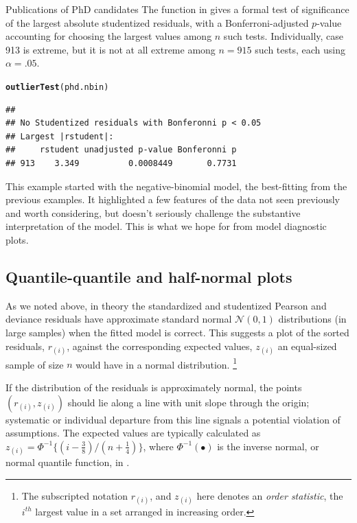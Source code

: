 \documentclass[11pt]{book}\usepackage[]{graphicx}\usepackage[]{color}
\makeatletter
\newcommand{\hlstd}[1]{\textcolor[rgb]{0.345,0.345,0.345}{#1}}%
\newcommand{\hlkwd}[1]{\textcolor[rgb]{0.737,0.353,0.396}{\textbf{#1}}}%
\newenvironment{kframe}{%
 \def\at@end@of@kframe{}%
 \ifinner\ifhmode%
  \def\at@end@of@kframe{\end{minipage}}%
  \begin{minipage}{\columnwidth}%
 \fi\fi%
 \def\FrameCommand##1{\hskip\@totalleftmargin \hskip-\fboxsep
 \colorbox{shadecolor}{##1}\hskip-\fboxsep
     \hskip-\linewidth \hskip-\@totalleftmargin \hskip\columnwidth}%
 \MakeFramed {\advance\hsize-\width
   \@totalleftmargin\z@ \linewidth\hsize
   \@setminipage}}%
 {\par\unskip\endMakeFramed%
 \at@end@of@kframe}
\newenvironment{knitrout}{}{} %
\renewenvironment{knitrout}{\small\renewcommand{\baselinestretch}{.85}}{} %
\makeatother
\begin{document}
\begin{Example}[phdpubs5]{Publications of PhD candidates}
The  function in  gives a formal test of significance of the largest absolute
studentized residuals, with a Bonferroni-adjusted $p$-value accounting for choosing the largest values
among $n$ such tests. Individually, case 913 is extreme, but it is not at all extreme among
$n=915$ such tests, each using $\alpha=.05$.

\begin{knitrout}
\color{fgcolor}\begin{kframe}
\begin{alltt}
\hlkwd{outlierTest}\hlstd{(phd.nbin)}
\end{alltt}
\begin{verbatim}
## 
## No Studentized residuals with Bonferonni p < 0.05
## Largest |rstudent|:
##     rstudent unadjusted p-value Bonferonni p
## 913    3.349          0.0008449       0.7731
\end{verbatim}
\end{kframe}
\end{knitrout}
This example started with the negative-binomial model, the best-fitting from the previous examples.  It highlighted a
few features of the data not seen previously and worth considering, but doesn't seriously challenge the 
substantive interpretation of the model.  This is what we hope for from model diagnostic plots.

\end{Example}

\subsection{Quantile-quantile and half-normal plots}

As we noted above, in theory
the standardized and studentized Pearson and deviance residuals have approximate
standard normal $\mathcal{N} (0,1)$
distributions (in large samples)
when the fitted model is correct.
This suggests a plot of the sorted residuals, $r_{(i)}$, against the
corresponding expected values,  $z_{(i)}$
an equal-sized sample of size $n$ would have in a
normal distribution.%
\footnote{
The subscripted notation $r_{(i)}$, and $z_{(i)}$ here denotes an \emph{order statistic}, the
$i^{th}$ largest value in a set arranged in increasing order.
}

If the distribution of the residuals is approximately
normal, the points $(r_{(i)}, z_{(i)})$ should lie along a line with unit slope through the origin;
systematic or individual departure from this line signals a potential violation of assumptions.
The expected values are typically calculated as
$z_{(i)} = \Phi^{-1} \{ (i-\frac{3}{8}) / ( n + \frac{1}{4}) \}$,
where $\Phi^{-1} (\bullet)$ is the inverse normal, or normal quantile function,  in \R.
\end{document}
